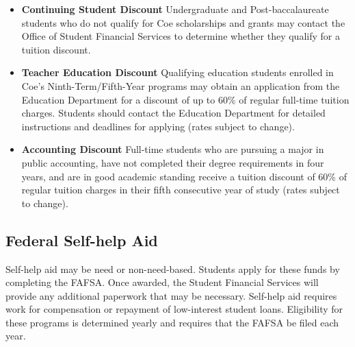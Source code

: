 \documentclass[
  letterpaper,
]{scrbook}
\begin{document}
\begin{itemize}
\item
  \textbf{Continuing Student Discount} Undergraduate and
  Post-baccalaureate students who do not qualify for Coe scholarships
  and grants may contact the Office of Student Financial Services to
  determine whether they qualify for a tuition discount.
\item
  \textbf{Teacher Education Discount} Qualifying education students
  enrolled in Coe's Ninth-Term/Fifth-Year programs may obtain an
  application from the Education Department for a discount of up to 60\%
  of regular full-time tuition charges. Students should contact the
  Education Department for detailed instructions and deadlines for
  applying (rates subject to change).
\item
  \textbf{Accounting Discount} Full-time students who are pursuing a
  major in public accounting, have not completed their degree
  requirements in four years, and are in good academic standing receive
  a tuition discount of 60\% of regular tuition charges in their fifth
  consecutive year of study (rates subject to change).
\end{itemize}

\subsection{Federal Self-help Aid}\label{federal-self-help-aid}

Self-help aid may be need or non-need-based. Students apply for these
funds by completing the FAFSA. Once awarded, the Student Financial
Services will provide any additional paperwork that may be necessary.
Self-help aid requires work for compensation or repayment of
low-interest student loans. Eligibility for these programs is determined
yearly and requires that the FAFSA be filed each year.
\end{document}
